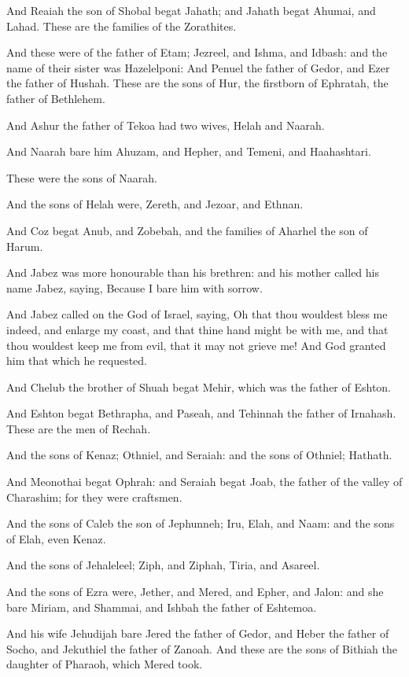 \verse And Reaiah the son of Shobal begat Jahath; and Jahath begat Ahumai, and Lahad. These are the families of the Zorathites.

\verse And these were of the father of Etam; Jezreel, and Ishma, and Idbash: and the name of their sister was Hazelelponi: \verse And Penuel the father of Gedor, and Ezer the father of Hushah. These are the sons of Hur, the firstborn of Ephratah, the father of Bethlehem.

\verse And Ashur the father of Tekoa had two wives, Helah and Naarah.

\verse And Naarah bare him Ahuzam, and Hepher, and Temeni, and Haahashtari.

These were the sons of Naarah.

\verse And the sons of Helah were, Zereth, and Jezoar, and Ethnan.

\verse And Coz begat Anub, and Zobebah, and the families of Aharhel the son of Harum.

\verse And Jabez was more honourable than his brethren: and his mother called his name Jabez, saying, Because I bare him with sorrow.

\verse And Jabez called on the God of Israel, saying, Oh that thou wouldest bless me indeed, and enlarge my coast, and that thine hand might be with me, and that thou wouldest keep me from evil, that it may not grieve me! And God granted him that which he requested.

\verse And Chelub the brother of Shuah begat Mehir, which was the father of Eshton.

\verse And Eshton begat Bethrapha, and Paseah, and Tehinnah the father of Irnahash. These are the men of Rechah.

\verse And the sons of Kenaz; Othniel, and Seraiah: and the sons of Othniel; Hathath.

\verse And Meonothai begat Ophrah: and Seraiah begat Joab, the father of the valley of Charashim; for they were craftsmen.

\verse And the sons of Caleb the son of Jephunneh; Iru, Elah, and Naam: and the sons of Elah, even Kenaz.

\verse And the sons of Jehaleleel; Ziph, and Ziphah, Tiria, and Asareel.

\verse And the sons of Ezra were, Jether, and Mered, and Epher, and Jalon: and she bare Miriam, and Shammai, and Ishbah the father of Eshtemoa.

\verse And his wife Jehudijah bare Jered the father of Gedor, and Heber the father of Socho, and Jekuthiel the father of Zanoah. And these are the sons of Bithiah the daughter of Pharaoh, which Mered took.

